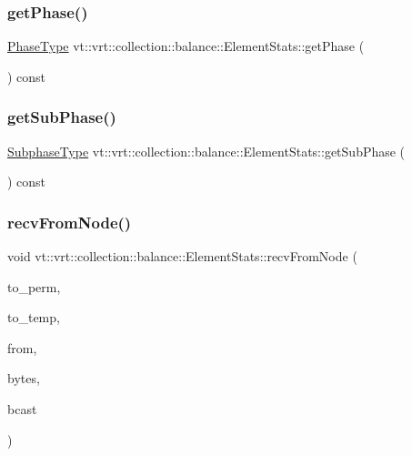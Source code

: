 \subsubsection{\texorpdfstring{get\+Phase()}{getPhase()}}
{\footnotesize\ttfamily \hyperlink{namespacevt_a46ce6733d5cdbd735d561b7b4029f6d7}{Phase\+Type} vt\+::vrt\+::collection\+::balance\+::\+Element\+Stats\+::get\+Phase (\begin{DoxyParamCaption}{ }\end{DoxyParamCaption}) const}

\mbox{\label{structvt_1_1vrt_1_1collection_1_1balance_1_1_element_stats_aa6876c8014bf0b9c9bf0061ed70ad721}} 
\subsubsection{\texorpdfstring{get\+Sub\+Phase()}{getSubPhase()}}
{\footnotesize\ttfamily \hyperlink{namespacevt_ae78cbfdf1e57470e33eedb074f2beeba}{Subphase\+Type} vt\+::vrt\+::collection\+::balance\+::\+Element\+Stats\+::get\+Sub\+Phase (\begin{DoxyParamCaption}{ }\end{DoxyParamCaption}) const}

\mbox{\label{structvt_1_1vrt_1_1collection_1_1balance_1_1_element_stats_af251d52d4d0be99a7745295148abcb4e}} 
\subsubsection{\texorpdfstring{recv\+From\+Node()}{recvFromNode()}}
{\footnotesize\ttfamily void vt\+::vrt\+::collection\+::balance\+::\+Element\+Stats\+::recv\+From\+Node (\begin{DoxyParamCaption}\item[{\hyperlink{namespacevt_1_1vrt_1_1collection_1_1balance_a14c8d2c972f2913aa3f1636e5be0a120}{Element\+I\+D\+Type}}]{to\+\_\+perm,  }\item[{\hyperlink{namespacevt_1_1vrt_1_1collection_1_1balance_a14c8d2c972f2913aa3f1636e5be0a120}{Element\+I\+D\+Type}}]{to\+\_\+temp,  }\item[{\hyperlink{namespacevt_a866da9d0efc19c0a1ce79e9e492f47e2}{Node\+Type}}]{from,  }\item[{double}]{bytes,  }\item[{bool}]{bcast }\end{DoxyParamCaption})}

